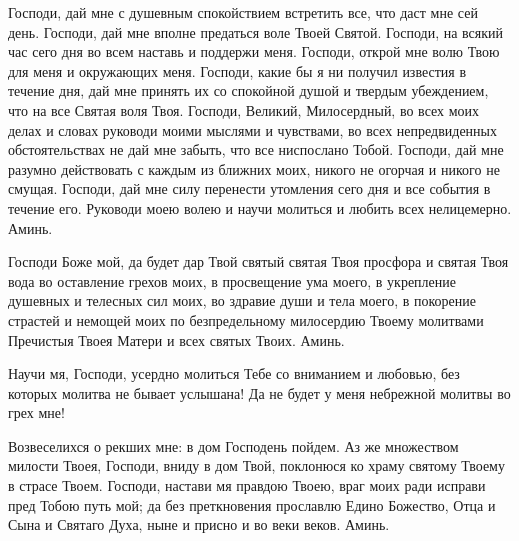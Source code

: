 \begin{mymulticols}



Господи, дай мне с душевным спокойствием встретить все, что даст мне сей день. Господи, дай мне вполне предаться воле Твоей Святой. Господи, на всякий час сего дня во всем наставь и поддержи меня. Господи, открой мне волю Твою для меня и окружающих меня. Господи, какие бы я ни получил известия в течение дня, дай мне принять их со спокойной душой и твердым убеждением, что на все Святая воля Твоя. Господи, Великий, Милосердный, во всех моих делах и словах руководи моими мыслями и чувствами, во всех непредвиденных обстоятельствах не дай мне забыть, что все ниспослано Тобой. Господи, дай мне разумно действовать с каждым из ближних моих, никого не огорчая и никого не смущая. Господи, дай мне силу перенести утомления сего дня и все события в течение его. Руководи моею волею и научи молиться и любить всех нелицемерно. Аминь.

\end{mymulticols}

\mychapterending


\begin{mymulticols}



Господи Боже мой, да будет дар Твой святый святая Твоя просфора и святая Твоя вода во оставление грехов моих, в просвещение ума моего, в укрепление душевных и телесных сил моих, во здравие души и тела моего, в покорение страстей и немощей моих по безпредельному милосердию Твоему молитвами Пречистыя Твоея Матери и всех святых Твоих. Аминь.



\end{mymulticols}

\mychapterending






Научи мя, Господи, усердно молиться Тебе со вниманием и любовью, без которых молитва не бывает услышана! Да не будет у меня небрежной молитвы во грех мне!


\mychapterending


\begin{mymulticols}




Возвеселихся о рекших мне: в дом Господень пойдем. Аз же множеством милости Твоея, Господи, вниду в дом Твой, поклонюся ко храму святому Твоему в страсе Твоем. Господи, настави мя правдою Твоею, враг моих ради исправи пред Тобою путь мой; да без преткновения прославлю Едино Божество, Отца и Сына и Святаго Духа, ныне и присно и во веки веков. Аминь.

\end{mymulticols}

